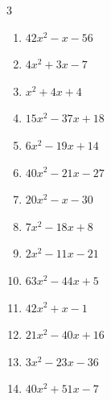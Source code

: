 \begin{multicols}{3}
\begin{enumerate}
        \phantom{$=(x+6)(x+2)$}

  \item $42x^{2}-x-56$

        \phantom{$=(6x-7)(7x+8)$}

\columnbreak %

  \item $4x^{2}+3x-7$

        \phantom{$=(x-1)(4x+7)$}

  \item $x^{2}+4x+4$


  \item $15x^{2}-37x+18$

        \phantom{$=(5x-9)(3x-2)$}

  \item $6x^{2}-19x+14$

        \phantom{$=(x-2)(6x-7)$}

  \item $40x^{2}-21x-27$

        \phantom{$=(5x+3)(8x-9)$}

  \item $20x^{2}-x-30$

        \phantom{$=(4x-5)(5x+6)$}

  \item $7x^{2}-18x+8$

        \phantom{$=(x-2)(7x-4)$}

  \item $2x^{2}-11x-21$

        \phantom{$=(2x+3)(x-7)$}

  \item $63x^{2}-44x+5$

        \phantom{$=(7x-1)(9x-5)$}

  \item $42x^{2}+x-1$

        \phantom{$=(7x-1)(6x+1)$}

\columnbreak %

\resetques

  \item $21x^{2}-40x+16$

        \phantom{$=(3x-4)(7x-4)$}

  \item $3x^{2}-23x-36$

        \phantom{$=(x-9)(3x+4)$}

  \item $40x^{2}+51x-7$


\end{enumerate}
\end{multicols}
